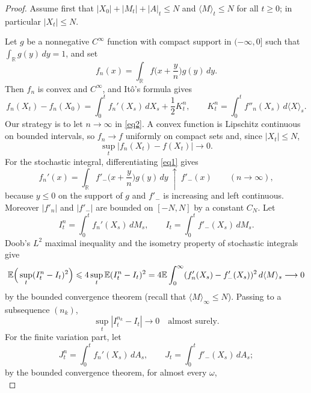 \begin{proof}
	Assume first that $|X_0| + |M_t| + |A|_t \leqslant N$ and
	$\langle M\rangle _t\leqslant N$ for all $t\geqslant 0$; in particular
	$|X_t|\leqslant N$.

	Let $g$ be a nonnegative $C^\infty$ function with compact support in
	$(-\infty,0]$ such that $\int_\mathbb{R} g(y)\,dy = 1$, and set
	\begin{equation}\label{eq1}
		f_n(x)=\int_\mathbb{R} f\Big(x+\frac{y}{n}\Big)g(y)\,dy .
	\end{equation}
	Then $f_n$ is convex and $C^\infty$, and It\^o's formula gives
	\begin{equation}\label{eq2}
		f_n(X_t)-f_n(X_0)=\int_0^t f_n'(X_s)\,dX_s + \frac{1}{2} K^n_t,
		\qquad
		K^n_t = \int_0^t f''_n(X_s)\,d\langle X\rangle _s .
	\end{equation}
	Our strategy is to let $n\to \infty$ in \eqref{eq2}. A convex function is
	Lipschitz continuous on bounded intervals, so $f_n\to f$ uniformly on
	compact sets and, since $|X_t| \leqslant N$,
	\begin{equation}\label{eq3}
		\sup_t |f_n(X_t) - f(X_t)| \longrightarrow 0 .
	\end{equation}
	For the stochastic integral, differentiating \eqref{eq1} gives
	\begin{equation}\label{eq4}
		f_n'(x)=\int_\mathbb{R} f'_-\Big( x+\frac{y}{n} \Big) g(y)\,dy
		\ \uparrow\ f'_-(x) \qquad (n\to\infty),
	\end{equation}
	because $y\leqslant 0$ on the support of $g$ and $f'_-$ is increasing and
	left continuous. Moreover $|f'_n|$ and $|f'_-|$ are bounded on $[-N,N]$
	by a constant $C_N$. Let
	\[
		I_t^n=\int_0^t f_n'(X_s)\,dM_s, \qquad I_t=\int_0^t f'_-(X_s)\,dM_s .
	\]
	Doob's $L^2$ maximal inequality and the isometry property of
	stochastic integrals give
	\[
		\mathbb{E} \Big( \sup_t (I_t^n-I_t)^2 \Big)
		\leqslant 4 \sup_t \mathbb{E}(I_t^n-I_t)^2
		= 4 \mathbb{E}\int_0^\infty (f_n'(X_s)- f'_-(X_s))^2\, d\langle M \rangle_s
		\longrightarrow 0
	\]
	by the bounded convergence theorem (recall that
	$\langle M\rangle_\infty \leqslant N$). Passing to a subsequence $(n_k)$,
	\begin{equation}\label{eq5}
		\sup_t |I_t^{n_k}-I_t| \longrightarrow 0\quad \text{almost surely.}
	\end{equation}
	For the finite variation part, let
	\[
		J_t^n=\int_0^t f_n'(X_s)\,dA_s, \qquad J_t=\int_0^t f'_-(X_s)\,dA_s ;
	\]
	by the bounded convergence theorem, for almost every $\omega$,
	\begin{equation}\label{eq6}

\end{equation}
\end{proof}
